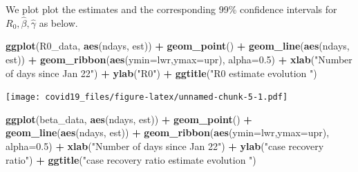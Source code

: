 \documentclass[]{article}
\newenvironment{Shaded}{\begin{snugshade}}{\end{snugshade}}
\newcommand{\DataTypeTok}[1]{\textcolor[rgb]{0.13,0.29,0.53}{#1}}
\newcommand{\DecValTok}[1]{\textcolor[rgb]{0.00,0.00,0.81}{#1}}
\newcommand{\FloatTok}[1]{\textcolor[rgb]{0.00,0.00,0.81}{#1}}
\newcommand{\KeywordTok}[1]{\textcolor[rgb]{0.13,0.29,0.53}{\textbf{#1}}}
\newcommand{\NormalTok}[1]{#1}
\newcommand{\OperatorTok}[1]{\textcolor[rgb]{0.81,0.36,0.00}{\textbf{#1}}}
\newcommand{\StringTok}[1]{\textcolor[rgb]{0.31,0.60,0.02}{#1}}
\begin{document}
\begin{Shaded}
\end{Shaded}

We plot plot the estimates and the corresponding 99\% confidence
intervals for \(R_{0}, \hat{\beta}, \hat{\gamma}\) as below.

\begin{Shaded}
\begin{Highlighting}[]
\KeywordTok{ggplot}\NormalTok{(R0_data, }\KeywordTok{aes}\NormalTok{(ndays, est)) }\OperatorTok{+}\StringTok{ }\KeywordTok{geom_point}\NormalTok{() }\OperatorTok{+}\StringTok{ }\KeywordTok{geom_line}\NormalTok{(}\KeywordTok{aes}\NormalTok{(ndays, est)) }\OperatorTok{+}\StringTok{ }\KeywordTok{geom_ribbon}\NormalTok{(}\KeywordTok{aes}\NormalTok{(}\DataTypeTok{ymin=}\NormalTok{lwr,}\DataTypeTok{ymax=}\NormalTok{upr), }\DataTypeTok{alpha=}\FloatTok{0.5}\NormalTok{) }\OperatorTok{+}\StringTok{ }\KeywordTok{xlab}\NormalTok{(}\StringTok{"Number of days since Jan 22"}\NormalTok{) }\OperatorTok{+}\StringTok{ }\KeywordTok{ylab}\NormalTok{(}\StringTok{"R0"}\NormalTok{) }\OperatorTok{+}\StringTok{ }\KeywordTok{ggtitle}\NormalTok{(}\StringTok{"R0 estimate evolution "}\NormalTok{)}
\end{Highlighting}
\end{Shaded}

\texttt{[image: covid19\_files/figure-latex/unnamed-chunk-5-1.pdf]}

\begin{Shaded}
\begin{Highlighting}[]
\KeywordTok{ggplot}\NormalTok{(beta_data, }\KeywordTok{aes}\NormalTok{(ndays, est)) }\OperatorTok{+}\StringTok{ }\KeywordTok{geom_point}\NormalTok{() }\OperatorTok{+}\StringTok{ }\KeywordTok{geom_line}\NormalTok{(}\KeywordTok{aes}\NormalTok{(ndays, est)) }\OperatorTok{+}\StringTok{ }\KeywordTok{geom_ribbon}\NormalTok{(}\KeywordTok{aes}\NormalTok{(}\DataTypeTok{ymin=}\NormalTok{lwr,}\DataTypeTok{ymax=}\NormalTok{upr), }\DataTypeTok{alpha=}\FloatTok{0.5}\NormalTok{) }\OperatorTok{+}\StringTok{ }\KeywordTok{xlab}\NormalTok{(}\StringTok{"Number of days since Jan 22"}\NormalTok{) }\OperatorTok{+}\StringTok{ }\KeywordTok{ylab}\NormalTok{(}\StringTok{"case recovery ratio"}\NormalTok{) }\OperatorTok{+}\StringTok{ }\KeywordTok{ggtitle}\NormalTok{(}\StringTok{"case recovery ratio estimate evolution "}\NormalTok{)}
\end{Highlighting}
\end{Shaded}
\end{document}
